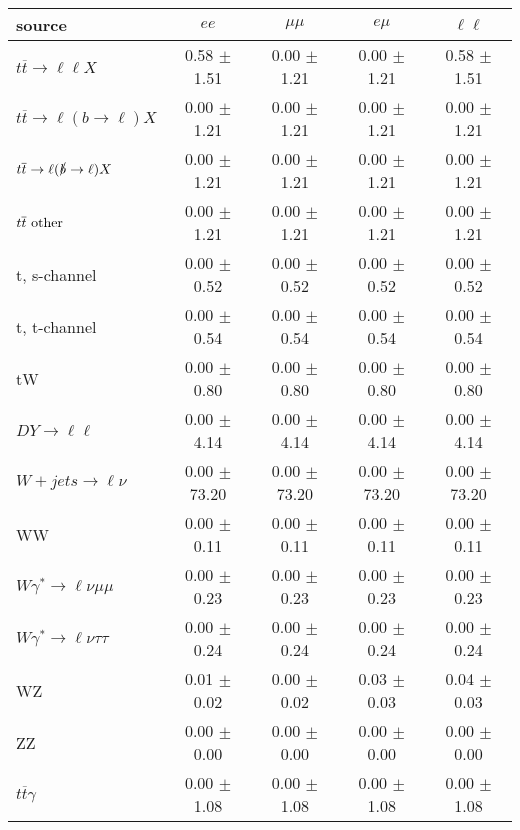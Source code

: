 \begin{tabular}{l|cccc} \hline\hline
source & $ee$ & $\mu\mu$ & $e\mu$ & $\ell\ell $ \\
\hline
$t\overline{t} \rightarrow \ell \ell X$ &  0.58 $\pm$  1.51 &  0.00 $\pm$  1.21 &  0.00 $\pm$  1.21 &  0.58 $\pm$  1.51 \\
$t\overline{t} \rightarrow \ell (b \rightarrow \ell) X$ &  0.00 $\pm$  1.21 &  0.00 $\pm$  1.21 &  0.00 $\pm$  1.21 &  0.00 $\pm$  1.21 \\
$t\overline{t} \rightarrow \ell (\slashed b \rightarrow \ell) X$ &  0.00 $\pm$  1.21 &  0.00 $\pm$  1.21 &  0.00 $\pm$  1.21 &  0.00 $\pm$  1.21 \\
        $t\overline{t}\ \rm{other}$ &  0.00 $\pm$  1.21 &  0.00 $\pm$  1.21 &  0.00 $\pm$  1.21 &  0.00 $\pm$  1.21 \\
\hline
                       t, s-channel &  0.00 $\pm$  0.52 &  0.00 $\pm$  0.52 &  0.00 $\pm$  0.52 &  0.00 $\pm$  0.52 \\
                       t, t-channel &  0.00 $\pm$  0.54 &  0.00 $\pm$  0.54 &  0.00 $\pm$  0.54 &  0.00 $\pm$  0.54 \\
                                 tW &  0.00 $\pm$  0.80 &  0.00 $\pm$  0.80 &  0.00 $\pm$  0.80 &  0.00 $\pm$  0.80 \\
\hline
         $DY \rightarrow \ell \ell$ &  0.00 $\pm$  4.14 &  0.00 $\pm$  4.14 &  0.00 $\pm$  4.14 &  0.00 $\pm$  4.14 \\
      $W+jets \rightarrow \ell \nu$ &  0.00 $\pm$ 73.20 &  0.00 $\pm$ 73.20 &  0.00 $\pm$ 73.20 &  0.00 $\pm$ 73.20 \\
                                 WW &  0.00 $\pm$  0.11 &  0.00 $\pm$  0.11 &  0.00 $\pm$  0.11 &  0.00 $\pm$  0.11 \\
\hline
$W\gamma^{*} \rightarrow \ell \nu \mu\mu$ &  0.00 $\pm$  0.23 &  0.00 $\pm$  0.23 &  0.00 $\pm$  0.23 &  0.00 $\pm$  0.23 \\
$W\gamma^{*} \rightarrow \ell \nu \tau\tau$ &  0.00 $\pm$  0.24 &  0.00 $\pm$  0.24 &  0.00 $\pm$  0.24 &  0.00 $\pm$  0.24 \\
                                 WZ &  0.01 $\pm$  0.02 &  0.00 $\pm$  0.02 &  0.03 $\pm$  0.03 &  0.04 $\pm$  0.03 \\
                                 ZZ &  0.00 $\pm$  0.00 &  0.00 $\pm$  0.00 &  0.00 $\pm$  0.00 &  0.00 $\pm$  0.00 \\
\hline
              $t\overline{t}\gamma$ &  0.00 $\pm$  1.08 &  0.00 $\pm$  1.08 &  0.00 $\pm$  1.08 &  0.00 $\pm$  1.08 \\

\end{tabular}
